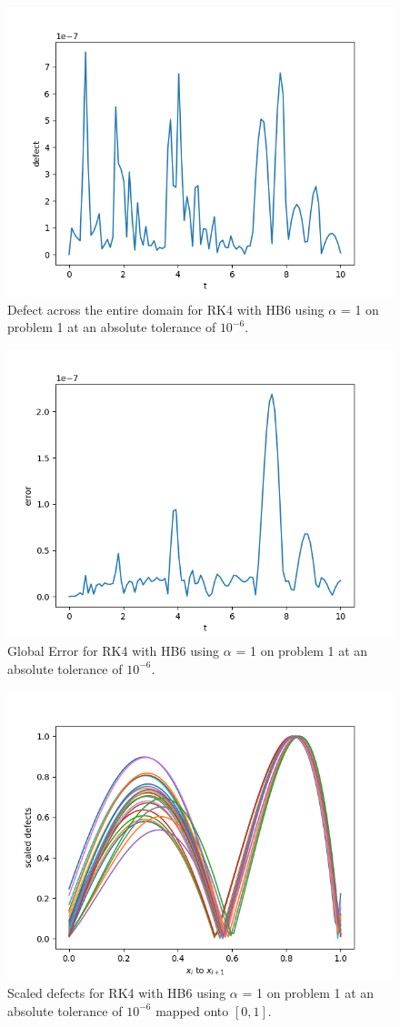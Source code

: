 \begin{figure}[H]
\centering
\includegraphics[width=0.7\linewidth]{./figures/static_alpha_rk4_with_hb6_p1_global_defect}
\caption{Defect across the entire domain for RK4 with HB6 using $\alpha$ = 1 on problem 1 at an absolute tolerance of $10^{-6}$.}
\label{fig:static_alpha_rk4_with_hb6_p1_global_defect}
\end{figure}

\begin{figure}[H]
\centering
\includegraphics[width=0.7\linewidth]{./figures/static_alpha_rk4_with_hb6_p1_global_error}
\caption{Global Error for RK4 with HB6 using $\alpha$ = 1 on problem 1 at an absolute tolerance of $10^{-6}$.}
\label{fig:static_alpha_rk4_with_hb6_p1_global_error}
\end{figure}

\begin{figure}[H]
\centering
\includegraphics[width=0.7\linewidth]{./figures/static_alpha_rk4_with_hb6_p1_scaled_defects}
\caption{Scaled defects for RK4 with HB6 using $\alpha$ = 1 on problem 1 at an absolute tolerance of $10^{-6}$ mapped onto $[0, 1]$.}
\label{fig:static_alpha_rk4_with_hb6_p1_scaled_defects}
\end{figure}

